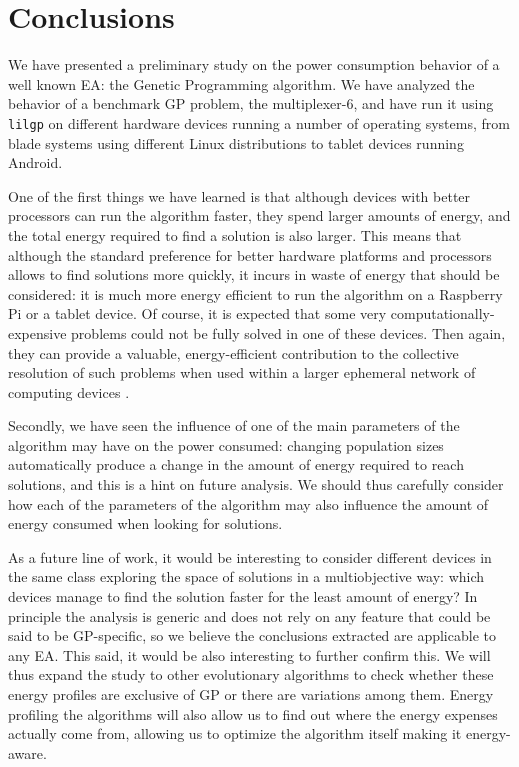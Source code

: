 \section{Conclusions}
\label{conclusions}

We have presented a preliminary study on the power consumption
behavior of a well known EA: the Genetic Programming algorithm.  We
have analyzed the behavior of a benchmark GP problem, the
multiplexer-6, and have run it using {\tt lilgp} on different
hardware devices running a number of operating systems, from blade
systems using different Linux distributions to tablet devices running
Android. 

One of the first things we have learned is that although devices with
better processors can run the algorithm faster, they spend
larger amounts of energy, and the total energy required to find a
solution is also larger.  This means that although the standard
preference for better hardware platforms and processors allows to find
solutions more quickly, it incurs in waste of energy that should be
considered:  it is much more energy efficient to run the algorithm on
a Raspberry Pi or a tablet device. Of course, it is expected that some very 
computationally-expensive problems could not be fully solved in one
of these devices. Then again, they can provide a valuable, energy-efficient
contribution to the collective resolution of such problems when used
within a larger ephemeral network of computing devices \cite{self}.

Secondly, we have seen the influence of one of the main parameters
of the algorithm may have on the power consumed:  changing population
sizes automatically produce a change in the amount of energy required to reach
solutions, and this is a hint on future analysis.  We should thus carefully
consider how each of the parameters of the algorithm may also
influence the amount of energy consumed when looking for solutions. 

As a future line of work, it would be interesting to consider
different devices in the same class exploring the space of
solutions in a multiobjective way: which devices manage to find the
solution faster for the least amount of energy?  In principle the analysis
is generic and does not rely on any 
feature that could be said to be GP-specific, so we believe the conclusions
extracted are applicable to any EA.  This said, it would be also interesting to further confirm
this. We will thus expand the study
to other evolutionary algorithms to check whether these energy
profiles are exclusive of GP or there are variations
among them. Energy profiling the algorithms will also allow us to find
out where the energy expenses actually come from, allowing us to
optimize the algorithm itself making it energy-aware.